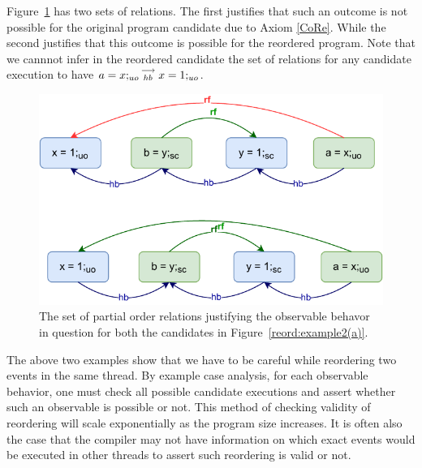        
        Figure~\ref{reord:example2(b)} has two sets of relations. 
        The first justifies that such an outcome is not possible for the original program candidate due to Axiom \ref{CoRe}. 
        While the second justifies that this outcome is possible for the reordered program.
        Note that we cannnot infer in the reordered candidate the set of relations for any candidate execution to have $a=x;_{uo}\stackrel{\longrightarrow}{_{hb}}x=1;_{uo}$. 
        \begin{figure}[H]
            \centering
            \includegraphics[scale=0.7]{5.InstructionReordering/0.Intro/ReorderingExample2(b).pdf}
            \caption{The set of partial order relations justifying the observable behavor in question for both the candidates in Figure~\ref{reord:example2(a)}.} 
            \label{reord:example2(b)}
        \end{figure}

        The above two examples show that we have to be careful while reordering two events in the same thread. 
        By example case analysis, for each observable behavior, one must check all possible candidate executions and assert whether such an observable is possible or not. 
        This method of checking validity of reordering will scale exponentially as the program size increases. 
        It is often also the case that the compiler may not have information on which exact events would be executed in other threads to assert such reordering is valid or not. 

    
    
    
    
    
